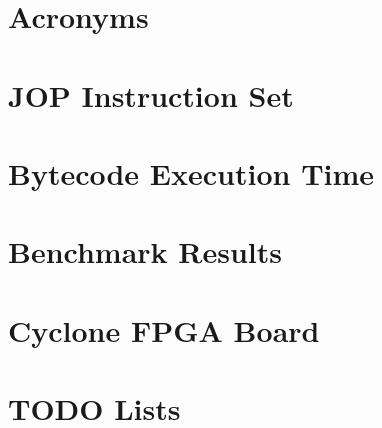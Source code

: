 \chapter{Acronyms}
 \label{appx:acro}



\chapter{JOP Instruction Set} \label{appx:jop:instr}


\chapter{Bytecode Execution Time} \label{appx:bytecode}


\chapter{Benchmark Results} \label{appx:bench}


\chapter{Cyclone FPGA Board} \label{appx:cycore}




\chapter{TODO Lists}




